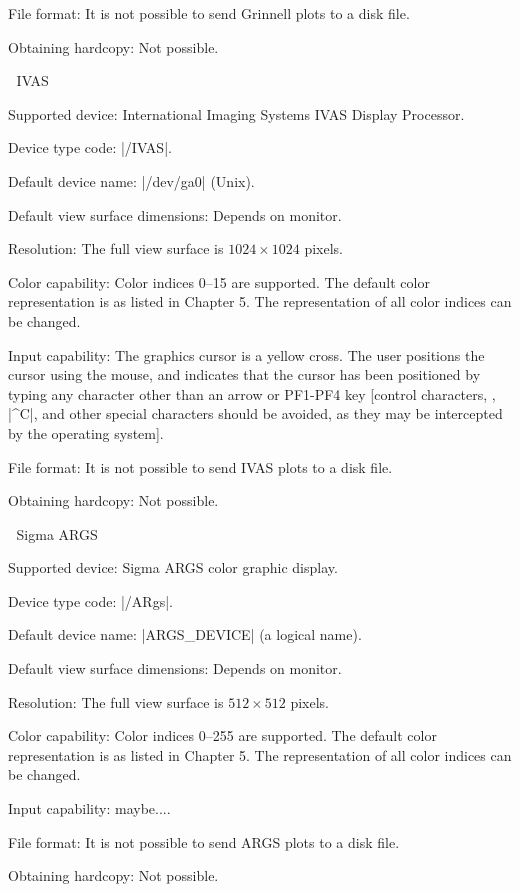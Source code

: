 \proclaim File format: It is not possible to send Grinnell plots to a 
disk file.

\proclaim Obtaining hardcopy: Not possible.


\beginsection IVAS

\proclaim Supported device: International Imaging Systems IVAS Display 
Processor.

\proclaim Device type code: |/IVAS|.

\proclaim Default device name: |/dev/ga0| (Unix).

\proclaim Default view surface dimensions: Depends on monitor.

\proclaim Resolution: The full view surface is $1024\times1024$ pixels. 

\proclaim Color capability: Color indices 0--15 are supported. The
default color representation is as listed in Chapter 5. The
representation of all color indices can be changed. 

\proclaim Input capability: The graphics cursor is a yellow cross.
The user positions the cursor using the mouse, and 
indicates that the cursor has been positioned by
typing any character other than an arrow or PF1-PF4 key [control
characters, \eg, |^C|, and other special characters should be avoided,
as they may be intercepted by the operating system]. 

\proclaim File format: It is not possible to send IVAS plots to a 
disk file.

\proclaim Obtaining hardcopy: Not possible.


\beginsection Sigma ARGS

\proclaim Supported device: Sigma ARGS color graphic display.

\proclaim Device type code: |/ARgs|.

\proclaim Default device name: |ARGS_DEVICE| (a logical name).

\proclaim Default view surface dimensions: Depends on monitor.

\proclaim Resolution: The full view surface is $512\times512$ pixels. 

\proclaim Color capability: Color indices 0--255 are supported. The
default color representation is as listed in Chapter 5. The
representation of all color indices can be changed. 

\proclaim Input capability: maybe....

\proclaim File format: It is not possible to send ARGS plots to a 
disk file.

\proclaim Obtaining hardcopy: Not possible.

